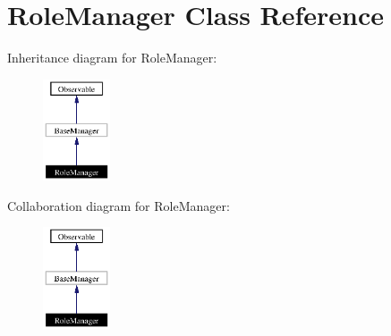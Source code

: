 \section{Role\-Manager Class Reference}
\label{classRoleManager}
Inheritance diagram for Role\-Manager:\begin{figure}[H]
\begin{center}
\leavevmode
\includegraphics[width=56pt]{classRoleManager__inherit__graph}
\end{center}
\end{figure}
Collaboration diagram for Role\-Manager:\begin{figure}[H]
\begin{center}
\leavevmode
\includegraphics[width=56pt]{classRoleManager__coll__graph}
\end{center}
\end{figure}
